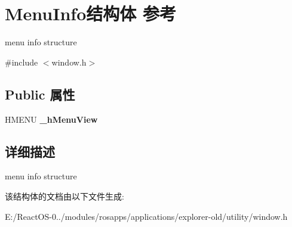 \hypertarget{struct_menu_info}{}\section{Menu\+Info结构体 参考}
\label{struct_menu_info}


menu info structure  




{\ttfamily \#include $<$window.\+h$>$}

\subsection*{Public 属性}
\begin{DoxyCompactItemize}
\item 
\mbox{\label{struct_menu_info_a8d50eabfe512d4540d1355b8f28af1b7}} 
H\+M\+E\+NU {\bfseries \+\_\+h\+Menu\+View}
\end{DoxyCompactItemize}


\subsection{详细描述}
menu info structure 

该结构体的文档由以下文件生成\+:\begin{DoxyCompactItemize}
\item 
E\+:/\+React\+O\+S-\/0../modules/rosapps/applications/explorer-\/old/utility/window.\+h\end{DoxyCompactItemize}
